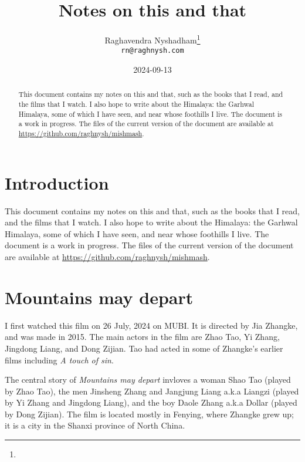 \documentclass{article}
\title{Notes on this and that}
\author{Raghavendra Nyshadham\thanks{\cczero} \\
  {\normalsize\nolinkurl{rn@raghnysh.com}}}
\date{2024-09-13}
\begin{document}
\begin{titlingpage}
  \maketitle

  \begin{abstract}
    This document contains my notes on this and that, such as the
    books that I read, and the films that I watch.  I also hope to
    write about the Himalaya: the Garhwal Himalaya, some of which I
    have seen, and near whose foothills I live.  The document is a
    work in progress.  The files of the current version of the
    document are available at
    \url{https://github.com/raghnysh/mishmash}.

  \end{abstract}
\end{titlingpage}

\tableofcontents

\section{Introduction}
\label{sec:113nrd0o}

This document contains my notes on this and that, such as the books
that I read, and the films that I watch.  I also hope to write about
the Himalaya: the Garhwal Himalaya, some of which I have seen, and
near whose foothills I live.  The document is a work in progress.  The
files of the current version of the document are available at
\url{https://github.com/raghnysh/mishmash}.
    
\section{Mountains may depart}
\label{sec:ov8yna0s}

I first watched this film on 26 July, 2024 on MUBI.  It is directed by
Jia Zhangke, and was made in 2015.  The main actors in the film are
Zhao Tao, Yi Zhang, Jingdong Liang, and Dong Zijian.  Tao had acted in
some of Zhangke's earlier films including \emph{A touch of sin}.

The central story of \emph{Mountains may depart} invloves a woman Shao
Tao (played by Zhao Tao), the men Jinsheng Zhang and Jangjung Liang
a.k.a Liangzi (played by Yi Zhang and Jingdong Liang), and the boy
Daole Zhang a.k.a Dollar (played by Dong Zijian).  The film is located
mostly in Fenying, where Zhangke grew up; it is a city in the Shanxi
province of North China.
\end{document}
